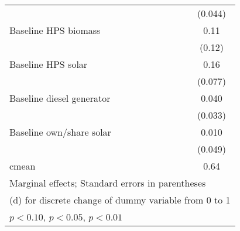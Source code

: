 \begin{table}[htbp]
\begin{tabular*}{1\hsize}{@{\hskip\tabcolsep\extracolsep\fill}l*{5}{c}}
                &                  &                  &                  &                  &  (0.044)         \\
Baseline HPS biomass&                  &                  &                  &                  &     0.11         \\
                &                  &                  &                  &                  &   (0.12)         \\
Baseline HPS solar&                  &                  &                  &                  &     0.16\sym{**} \\
                &                  &                  &                  &                  &  (0.077)         \\
Baseline diesel generator&                  &                  &                  &                  &    0.040         \\
                &                  &                  &                  &                  &  (0.033)         \\
Baseline own/share solar&                  &                  &                  &                  &    0.010         \\
                &                  &                  &                  &                  &  (0.049)         \\
\midrule
cmean           &                  &                  &                  &                  &     0.64         \\
\bottomrule
\multicolumn{6}{l}{\footnotesize Marginal effects; Standard errors in parentheses}\\
\multicolumn{6}{l}{\footnotesize  (d) for discrete change of dummy variable from 0 to 1}\\
\multicolumn{6}{l}{\footnotesize \sym{*} \(p<0.10\), \sym{**} \(p<0.05\), \sym{***} \(p<0.01\)}\\
\end{tabular*}
\end{table}
